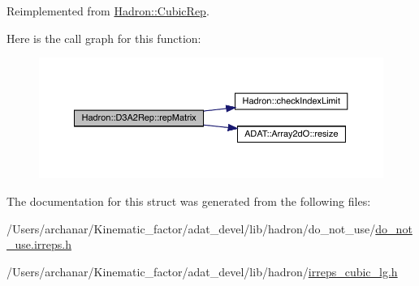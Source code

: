 Reimplemented from \mbox{\hyperlink{structHadron_1_1CubicRep_ac5d7e9e6f4ab1158b5fce3e4ad9e8005}{Hadron\+::\+Cubic\+Rep}}.

Here is the call graph for this function\+:
\nopagebreak
\begin{figure}[H]
\begin{center}
\leavevmode
\includegraphics[width=350pt]{d5/d7f/structHadron_1_1D3A2Rep_a0e868a4c14c9126108a49d429add3c94_cgraph}
\end{center}
\end{figure}


The documentation for this struct was generated from the following files\+:\begin{DoxyCompactItemize}
\item 
/\+Users/archanar/\+Kinematic\+\_\+factor/adat\+\_\+devel/lib/hadron/do\+\_\+not\+\_\+use/\mbox{\hyperlink{do__not__use_8irreps_8h}{do\+\_\+not\+\_\+use.\+irreps.\+h}}\item 
/\+Users/archanar/\+Kinematic\+\_\+factor/adat\+\_\+devel/lib/hadron/\mbox{\hyperlink{lib_2hadron_2irreps__cubic__lg_8h}{irreps\+\_\+cubic\+\_\+lg.\+h}}\end{DoxyCompactItemize}
